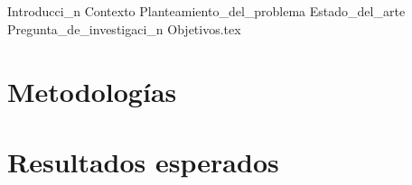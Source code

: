 \documentclass{article}
\begin{document}
  \begin{titlepage}
    \centering
    \vspace*{2cm}
    \titleblock [2cm]
    \vspace{1cm}  %
    \authorblock
    \vfill  %
    \location \\
    \dateblock \\
    \footnotesize { \texttt{\fullversion} }
  \end{titlepage}

  
  \attributionpage

  \tableofcontents
  \newpage

  \clearpage

  {Introducci_n}
  {Contexto}
  {Planteamiento_del_problema}
  {Estado_del_arte}
  {Pregunta_de_investigaci_n}
  {Objetivos.tex}

  \section{Metodologías}
    \Blindtext

  \section{Resultados esperados}
    \blindtext

  \printbibliography
\end{document}
